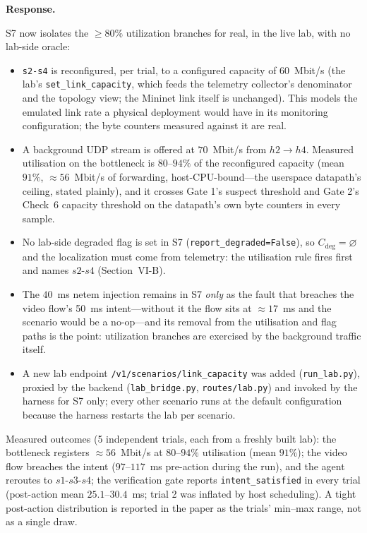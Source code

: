 \documentclass[11pt,a4paper]{article}
\newenvironment{response}{\par\noindent\begin{minipage}{\linewidth}\small\textbf{Response.}\par}{\end{minipage}\medskip\par}
\begin{document}
\begin{response}
S7 now isolates the $\ge 80\%$ utilization branches for real, in the live
lab, with no lab-side oracle:

\begin{itemize}
  \item \texttt{s2-s4} is reconfigured, per trial, to a configured
    capacity of $60$~Mbit/s (the lab's \texttt{set\_link\_capacity}, which
    feeds the telemetry collector's denominator and the topology view; the
    Mininet link itself is unchanged). This models the emulated link rate
    a physical deployment would have in its monitoring configuration; the
    byte counters measured against it are real.
  \item A background UDP stream is offered at $70$~Mbit/s from
    $h2 \rightarrow h4$. Measured utilisation on the bottleneck is
    $80$--$94\%$ of the reconfigured capacity (mean $91\%$, $\approx 56$~Mbit/s
    of forwarding, host-CPU-bound---the userspace datapath's ceiling, stated
    plainly), and it crosses Gate 1's suspect threshold and Gate 2's
    Check~6 capacity threshold on the datapath's own byte counters in every
    sample.
  \item No lab-side degraded flag is set in S7
    (\texttt{report\_degraded=False}), so $C_{\mathrm{deg}}=\varnothing$
    and the localization must come from telemetry: the utilisation rule
    fires first and names $s2$-$s4$ (Section~VI-B).
  \item The $40$~ms netem injection remains in S7 \emph{only} as the fault
    that breaches the video flow's 50~ms intent---without it the flow sits
    at $\approx 17$~ms and the scenario would be a no-op---and its
    removal from the utilisation and flag paths is the point: utilization
    branches are exercised by the background traffic itself.
  \item A new lab endpoint \texttt{/v1/scenarios/link\_capacity} was added
    (\texttt{run\_lab.py}), proxied by the backend
    (\texttt{lab\_bridge.py}, \texttt{routes/lab.py}) and invoked by the
    harness for S7 only; every other scenario runs at the default
    configuration because the harness restarts the lab per scenario.
\end{itemize}

Measured outcomes (5 independent trials, each from a freshly built lab):
the bottleneck registers $\approx 56$~Mbit/s at $80$--$94\%$ utilisation
(mean $91\%$);
the video flow breaches the intent ($97$--$117$~ms pre-action during the
run), and the agent reroutes to $s1$-$s3$-$s4$; the verification gate
reports \texttt{intent\_satisfied} in every trial (post-action mean
$25.1$--$30.4$~ms; trial 2 was inflated by host scheduling). A tight
post-action distribution is reported in the paper as the trials'
min--max range, not as a single draw.


\end{response}
\end{document}
